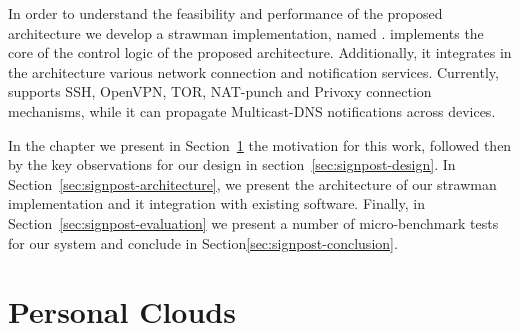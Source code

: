 
In order to understand the feasibility and performance of the proposed
architecture we develop a strawman implementation, named {\it \signpost}.
\signpost implements the core of the control logic of the proposed architecture.
Additionally, it integrates in the architecture various network connection and
notification services.  Currently, \signpost supports SSH, OpenVPN, TOR,
NAT-punch and Privoxy connection mechanisms, while it can propagate
Multicast-DNS notifications across devices.

In the chapter we present in Section~\ref{sec:signpost-introduction} the
motivation for this work, followed then by the key observations for our design
in section~\ref{sec:signpost-design}. In
Section~\ref{sec:signpost-architecture}, we present the
architecture of our strawman implementation and it integration with existing
software. Finally, in Section~\ref{sec:signpost-evaluation}
we present a number of micro-benchmark tests for our system and conclude in
Section\ref{sec:signpost-conclusion}.

\section{Personal Clouds}\label{sec:signpost-introduction}

